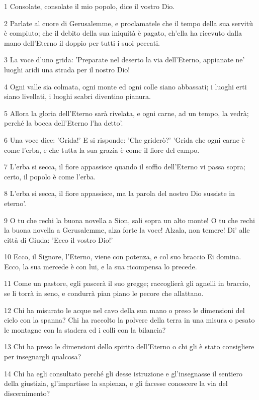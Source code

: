 \par 1 Consolate, consolate il mio popolo, dice il vostro Dio.
\par 2 Parlate al cuore di Gerusalemme, e proclamatele che il tempo della sua servitù è compiuto; che il debito della sua iniquità è pagato, ch'ella ha ricevuto dalla mano dell'Eterno il doppio per tutti i suoi peccati.
\par 3 La voce d'uno grida: 'Preparate nel deserto la via dell'Eterno, appianate ne' luoghi aridi una strada per il nostro Dio!
\par 4 Ogni valle sia colmata, ogni monte ed ogni colle siano abbassati; i luoghi erti siano livellati, i luoghi scabri diventino pianura.
\par 5 Allora la gloria dell'Eterno sarà rivelata, e ogni carne, ad un tempo, la vedrà; perché la bocca dell'Eterno l'ha detto'.
\par 6 Una voce dice: 'Grida!' E si risponde: 'Che griderò?' 'Grida che ogni carne è come l'erba, e che tutta la sua grazia è come il fiore del campo.
\par 7 L'erba si secca, il fiore appassisce quando il soffio dell'Eterno vi passa sopra; certo, il popolo è come l'erba.
\par 8 L'erba si secca, il fiore appassisce, ma la parola del nostro Dio sussiste in eterno'.
\par 9 O tu che rechi la buona novella a Sion, sali sopra un alto monte! O tu che rechi la buona novella a Gerusalemme, alza forte la voce! Alzala, non temere! Di' alle città di Giuda: 'Ecco il vostro Dio!'
\par 10 Ecco, il Signore, l'Eterno, viene con potenza, e col suo braccio Ei domina. Ecco, la sua mercede è con lui, e la sua ricompensa lo precede.
\par 11 Come un pastore, egli pascerà il suo gregge; raccoglierà gli agnelli in braccio, se li torrà in seno, e condurrà pian piano le pecore che allattano.
\par 12 Chi ha misurato le acque nel cavo della sua mano o preso le dimensioni del cielo con la spanna? Chi ha raccolto la polvere della terra in una misura o pesato le montagne con la stadera ed i colli con la bilancia?
\par 13 Chi ha preso le dimensioni dello spirito dell'Eterno o chi gli è stato consigliere per insegnargli qualcosa?
\par 14 Chi ha egli consultato perché gli desse istruzione e gl'insegnasse il sentiero della giustizia, gl'impartisse la sapienza, e gli facesse conoscere la via del discernimento?
